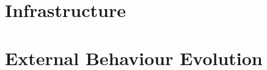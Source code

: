 \section{\covrig Infrastructure}
\label{sec:design}





\section{External Behaviour Evolution}
\label{sec:behavior-evolution}




